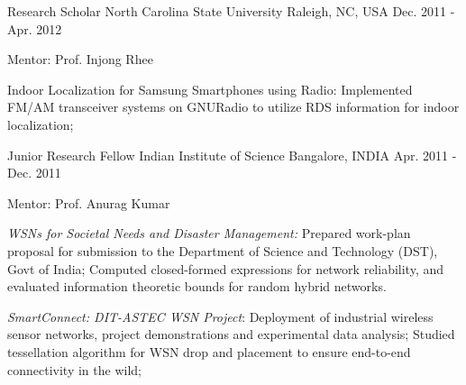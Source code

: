 \begin{cventries}
  \cventry
    {Research Scholar} %
    {North Carolina State University} %
    {Raleigh, NC, USA} %
    {Dec. 2011 - Apr. 2012} %
    {
      \begin{cvitems} %
    \item {Mentor: Prof. Injong Rhee}
    \item {Indoor Localization for Samsung Smartphones using Radio: Implemented FM/AM transceiver systems on GNURadio to utilize RDS information for indoor localization;}
      \end{cvitems}
    }
    
  \cventry
    {Junior Research Fellow} %
    {Indian Institute of Science} %
    {Bangalore, INDIA} %
    {Apr. 2011 - Dec. 2011} %
    {
      \begin{cvitems} %
    \item {Mentor: Prof. Anurag Kumar}
    \item {\emph{WSNs for Societal Needs and Disaster Management:} Prepared work-plan proposal for submission to the Department of Science and Technology (DST), Govt of India; Computed closed-formed expressions for network reliability, and evaluated information theoretic bounds for random hybrid networks.}
    \item {\emph{SmartConnect: DIT-ASTEC WSN Project}: Deployment of industrial wireless sensor networks, project demonstrations and experimental data analysis; Studied tessellation algorithm for WSN drop and placement to ensure end-to-end connectivity in the wild;}
      \end{cvitems}
    }
    

\end{cventries}
